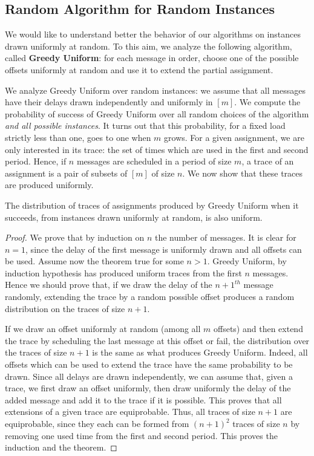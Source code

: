 \documentclass[a4paper,UKenglish,cleveref, autoref, thm-restate]{lipics-v2019}
\begin{document}
\subsection{Random Algorithm for Random Instances}

We would like to understand better the behavior of our algorithms
on instances drawn uniformly at random. To this aim, we analyze the following algorithm, called \textbf{Greedy Uniform}: for each message in order, choose one of the possible offsets uniformly at random and use it to extend the partial assignment. 

We analyze Greedy Uniform over random instances: we assume that all messages have 
their delays drawn independently and uniformly in $[m]$. We compute the probability of success of Greedy Uniform over all random choices of the algorithm \emph{and all possible instances}. 
It turns out that this probability, for a fixed load strictly less than one, goes to one when $m$ grows. 
For a given assignment, we are only interested in its trace: the set of times which are used in the first and second period. Hence, if $n$ messages are scheduled in a period of size $m$, a trace of an assignment is a pair of subsets of $[m]$ of size $n$. We now show that these traces are produced uniformly.

\begin{theorem}
The distribution of traces of assignments produced by Greedy Uniform when it succeeds, from instances drawn uniformly at random, is also uniform.
\end{theorem}
\begin{proof}
We prove that by induction on $n$ the number of messages. It is clear for $n=1$,
since the delay of the first message is uniformly drawn and all offsets can be used.
Assume now the theorem true for some $n>1$. Greedy Uniform, by induction hypothesis has produced
uniform traces from the first $n$ messages.  Hence we should prove that, if we draw the delay
of the $n+1^{th}$ message randomly, extending the trace by a random possible offset produces a random distribution on the traces of size $n+1$. 

 If we draw an offset uniformly at random (among all $m$ offsets) and then extend the trace by scheduling the last message at this offset or fail, the distribution over the traces of size $n+1$ is the same as what produces Greedy Uniform. Indeed, all offsets which can be used to extend the trace have the same probability to be drawn. Since all delays are drawn independently, we can assume that, given a trace, we first draw an offset uniformly, then draw uniformly the delay of the added message and add it to the trace if it is possible. This proves that all extensions of a given trace are equiprobable. Thus, all traces of size $n+1$ are equiprobable, since they each can be formed from $(n+1)^2$ traces of size $n$ by removing one used time from the first and second period. This proves the induction and the theorem.
\end{proof}
\end{document}

